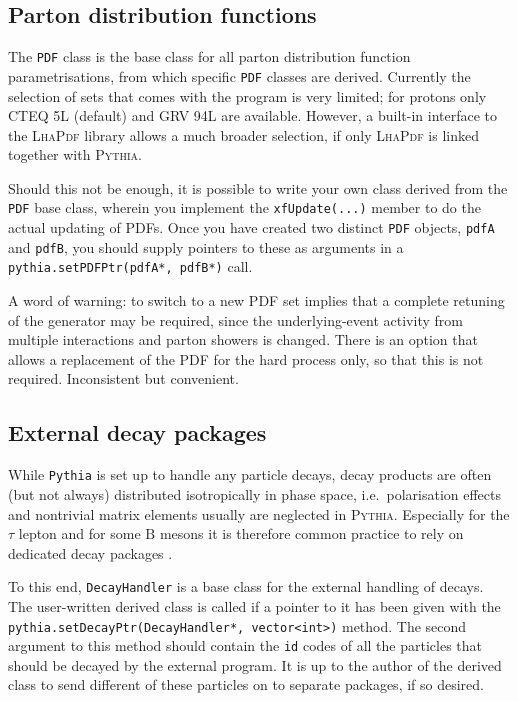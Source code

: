 \documentclass{elsartmod}
\begin{document}
\subsection{Parton distribution functions}

The \texttt{PDF} class is the base class for all parton distribution 
function parametrisations, from which specific \texttt{PDF} classes 
are derived. Currently the selection of sets that comes with the 
program is very limited; for protons only CTEQ 5L (default) and 
GRV 94L are available. However, a built-in interface to the
\textsc{LhaPdf} library \cite{lhapdf} allows a much broader selection, 
if only \textsc{LhaPdf} is linked together with \textsc{Pythia}.

Should this not be enough, it is possible to write your own class 
derived from the \texttt{PDF} base class, wherein you implement the
\texttt{xfUpdate(...)} member to do the actual updating of PDFs.
Once you have created two distinct \texttt{PDF} objects, \texttt{pdfA} 
and \texttt{pdfB}, you should supply pointers to these as arguments in 
a \texttt{pythia.setPDFPtr(pdfA*, pdfB*)} call.

A word of warning: to switch to a new PDF set implies that a complete
retuning of the generator may be required, since the underlying-event
activity from multiple interactions and parton showers is changed. There 
is an option that allows a replacement of the PDF for the hard process 
only, so that this is not required. Inconsistent but convenient.

\subsection{External decay packages}

While \texttt{Pythia} is set up to handle any particle decays,
decay products are often (but not always) distributed isotropically 
in phase space, i.e.\ polarisation effects and nontrivial matrix
elements usually are neglected in \textsc{Pythia}. Especially for the 
$\tau$ lepton and for some $\mathrm{B}$ mesons it is therefore common 
practice to rely on dedicated decay packages \cite{tauola, evtgen}.

To this end, \texttt{DecayHandler} is a base class for the external 
handling of decays. The user-written derived class is called if a 
pointer to it has been given with the 
\texttt{pythia.setDecayPtr(DecayHandler*, vector<int>)} method. 
The second argument to this method should contain the \texttt{id} 
codes of all the particles that should be decayed by the external 
program. It is up to the author of the derived class to send different 
of these particles on to separate packages, if so desired.  
\end{document}
